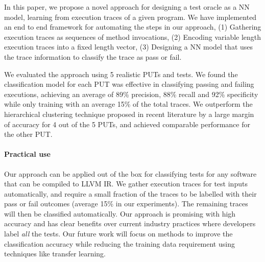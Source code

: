 In this paper, we propose a novel approach for designing a test oracle as a NN model, learning from execution traces of a given program. 
We have implemented an end to end framework for automating the steps in our approach, (1) Gathering execution traces as sequences of method invocations, (2) Encoding variable length execution traces into a fixed length vector, (3) Designing a NN model that uses the trace information to classify the trace as pass or fail. 

We evaluated the approach using 5 realistic PUTs and tests. We found the classification model for each PUT was effective in classifying passing and failing executions, achieving an average of 89\% precision, 88\% recall and 92\% specificity while only training with an average 15\% of the total traces. %
We outperform the hierarchical clustering technique proposed in recent literature by a large margin of accuracy for 4 out of the 5 PUTs, and achieved comparable performance for the other PUT.

\paragraph{Practical use} Our approach can be applied out of the box for classifying tests for any software that can be compiled to LLVM IR. We gather execution traces for test inputs automatically, and require a small fraction of the traces to be labelled with their pass or fail outcomes (average 15\% in our experiments). The remaining traces will then be classified automatically. Our approach is promising with high accuracy and has clear benefits over current industry practices where developers label \emph{all} the tests. Our future work will focus on methods to improve the classification accuracy while reducing the training data requirement using techniques like transfer learning. 


